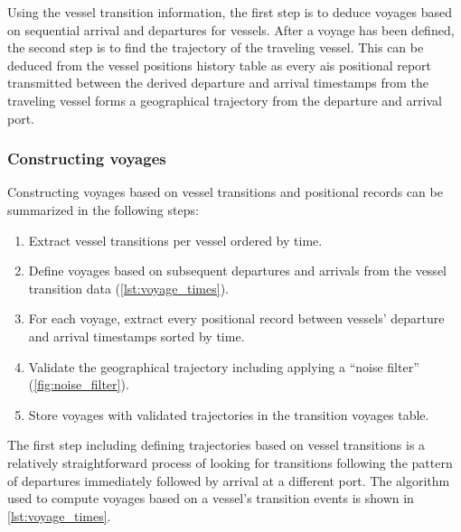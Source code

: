 Using the vessel transition information, the first step is to deduce voyages based on sequential arrival and departures for vessels. After a voyage has been defined, the second step is to find the trajectory of the traveling vessel. This can be deduced from the vessel positions history table as every \acrshort{ais} positional report transmitted between the derived departure and arrival timestamps from the traveling vessel forms a geographical trajectory from the departure and arrival port.

\subsubsection{Constructing voyages}

Constructing voyages based on vessel transitions and positional records can be summarized in the following steps:

\begin{enumerate}
    \item Extract vessel transitions per vessel ordered by time.
    \item Define voyages based on subsequent departures and arrivals from the vessel transition data (\cref{lst:voyage_times}).
    \item For each voyage, extract every positional record between vessels' departure and arrival timestamps sorted by time.
    \item Validate the geographical trajectory including applying a ``noise filter'' (\cref{fig:noise_filter}).
    \item Store voyages with validated trajectories in the transition voyages table.
\end{enumerate}

The first step including defining trajectories based on vessel transitions is a relatively straightforward process of looking for transitions following the pattern of departures immediately followed by arrival at a different port. The algorithm used to compute voyages based on a vessel's transition events is shown in \cref{lst:voyage_times}.

